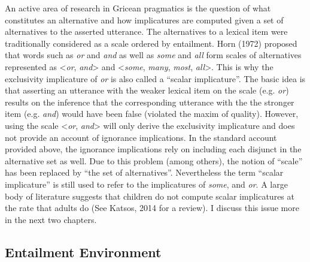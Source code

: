 \documentclass[oneside]{report}
\theoremstyle{definition}
\theoremstyle{definition}
\theoremstyle{definition}
\theoremstyle{remark}
\begin{document}
An active area of research in Gricean pragmatics is the question of what
constitutes an alternative and how implicatures are computed given a set
of alternatives to the asserted utterance. The alternatives to a lexical
item were traditionally considered as a scale ordered by entailment.
Horn (1972) proposed that words such as \emph{or} and \emph{and} as well
as \emph{some} and \emph{all} form scales of alternatives represented as
\textless{}\emph{or}, \emph{and}\textgreater{} and
\textless{}\emph{some}, \emph{many}, \emph{most},
\emph{all}\textgreater{}. This is why the exclusivity implicature of
\emph{or} is also called a ``scalar implicature''. The basic idea is
that asserting an utterance with the weaker lexical item on the scale
(e.g. \emph{or}) results on the inference that the corresponding
utterance with the the stronger item (e.g. \emph{and}) would have been
false (violated the maxim of quality). However, using the scale
\textless{}\emph{or}, \emph{and}\textgreater{} will only derive the
exclusivity implicature and does not provide an account of ignorance
implications. In the standard account provided above, the ignorance
implications rely on including each disjunct in the alternative set as
well. Due to this problem (among others), the notion of ``scale'' has
been replaced by ``the set of alternatives''. Nevertheless the term
``scalar implicature'' is still used to refer to the implicatures of
\emph{some}, and \emph{or}. A large body of literature suggests that
children do not compute scalar implicatures at the rate that adults do
(See Katsos, 2014 for a review). I discuss this issue more in the next
two chapters.

\subsection{Entailment Environment}\label{entailment-environment}
\end{document}
